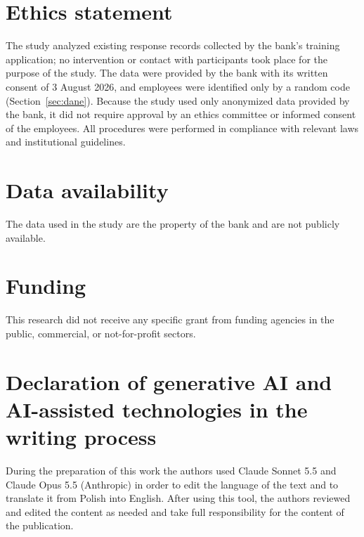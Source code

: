 
\section*{Ethics statement}
The study analyzed existing response records collected by the bank's training application; no
intervention or contact with participants took place for the purpose of the study. The data were
provided by the bank with its written consent of 3 August 2026, and employees were identified only by
a random code (Section~\ref{sec:dane}). Because the study used only anonymized data provided by the
bank, it did not require approval by an ethics committee or informed consent of the employees. All procedures were performed in compliance
with relevant laws and institutional guidelines.

\section*{Data availability}
The data used in the study are the property of the bank and are not publicly available.

\section*{Funding}
This research did not receive any specific grant from funding agencies in the public, commercial, or
not-for-profit sectors.

\section*{Declaration of generative AI and AI-assisted technologies in the writing process}
During the preparation of this work the authors used Claude Sonnet 5.5 and Claude Opus 5.5 (Anthropic)
in order to edit the language of the text and to translate it from Polish into English. After using
this tool, the authors reviewed and edited the content as needed and take full responsibility for the
content of the publication.
